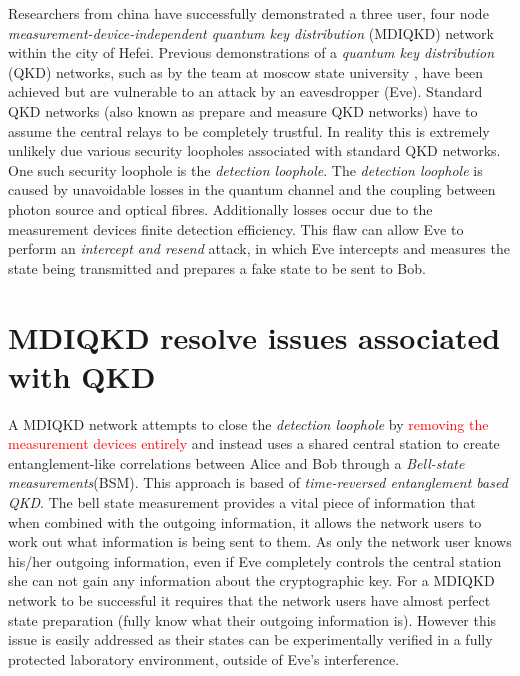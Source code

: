 \documentclass[journal]{vgtc}
\begin{document}
Researchers from china have successfully demonstrated a three user, four node \textit{measurement-device-independent quantum key distribution} (MDIQKD) network within the city of Hefei. Previous demonstrations of a \textit{quantum key distribution} (QKD) networks, such as by the team at moscow state university\cite{2017QuEle..47..798K} , have been achieved but are vulnerable to an attack by an eavesdropper (Eve). Standard QKD networks (also known as prepare and measure QKD networks) have to assume the central relays to be completely trustful. In reality this is extremely unlikely due various security loopholes associated with standard QKD networks. One such security loophole is the \textit{detection loophole}. The \textit{detection loophole} is caused by unavoidable losses in the quantum channel and  the coupling between photon source and optical fibres. Additionally losses occur due to the measurement devices finite detection efficiency. This flaw can allow Eve to perform an \textit{intercept and resend} attack, in which Eve intercepts and measures the state being transmitted and prepares a fake state to be sent to Bob.

\section{MDIQKD resolve issues associated with QKD}


A MDIQKD network attempts to close the \textit{detection loophole} by \textcolor{red}{removing the measurement devices entirely} and instead uses a shared  central station to create entanglement-like correlations between Alice and Bob through a \textit{Bell-state measurements}(BSM). This approach is based of \textit{time-reversed entanglement based QKD}\cite{PhysRevA.54.2651}. The bell state measurement provides a vital piece of information that when combined with the outgoing information, it allows the network users to work out what information is being sent to them. As only the network user knows his/her outgoing information, even if Eve completely controls the central station she can not gain any information about the cryptographic key. For a MDIQKD network to be successful it requires that the network users have almost perfect state preparation (fully know what their outgoing information is). However this issue is easily addressed as their states can be experimentally verified in a fully protected laboratory environment, outside of Eve's interference.  
\end{document}
